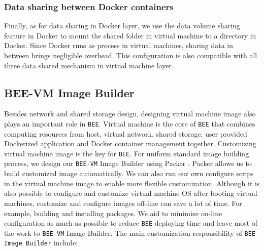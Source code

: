 \subsubsection{Data sharing between Docker containers}
Finally, as for data sharing in Docker layer, we use the data volume sharing feature in Docker to mount the shared folder in virtual machine to a directory in Docker. Since Docker runs as process in virtual machines, sharing data in between brings negligible overhead. This configuration is also compatible with all three data shared mechanism in virtual machine layer.

\subsection{BEE-VM Image Builder}
Besides network and shared storage design, designing virtual machine image also plays an important role in \texttt{BEE}. Virtual machine is the core of \texttt{BEE} that combines computing resources from host, virtual network, shared storage, user provided Dockerized application and Docker container management together. Customizing virtual machine image is the key for \texttt{BEE}. For uniform standard image building process, we design our \texttt{BEE-VM} Image Builder using Packer \cite{packer}. Packer allows us to build customized image automatically. We can also run our own configure scrips in the virtual machine image to enable more flexible customization. Although it is also possible to configure and customize virtual machine OS after booting virtual machines, customize and configure images off-line can save a lot of time. For example, building and installing packages. We aid to minimize on-line configuration as much as possible to reduce \texttt{BEE} deploying time and leave most of the work to \texttt{BEE-VM} Image Builder. The main customization responsibility of \texttt{BEE Image Builder} include:

